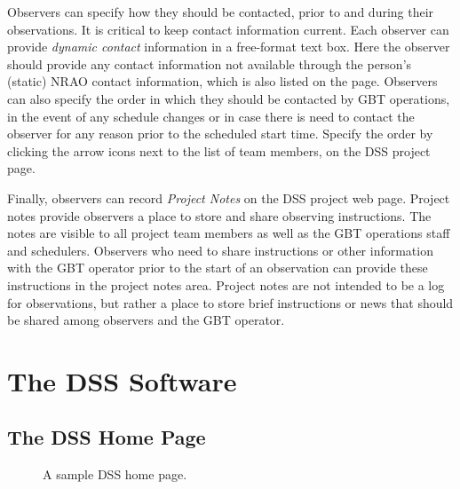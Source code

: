 Observers can specify how they should be contacted, prior to and during their
observations. It is critical to keep contact information current.
Each observer can provide {\it dynamic contact} information in a free-format
text box. Here the observer should provide 
any contact information not available through the person's (static) \gls{NRAO}
contact information, which is also listed on the page. Observers can also specify
the order in which they should be contacted by \gls{GBT} operations, in the event
of any schedule changes or in case there is need to contact the observer for any
reason prior to the scheduled start time. Specify the order by clicking the arrow
icons next to the list of team members, on the \gls{DSS} project page.

Finally, observers can record {\it Project Notes} on the \gls{DSS} project web page.
Project notes provide observers a place to store and share observing instructions.
The notes are visible to all project team members as well as the \gls{GBT} operations
staff and schedulers. Observers who need to share instructions or other information
with the \gls{GBT} operator prior to the start of an observation can provide these
instructions in the project notes area. Project notes are not intended to be a log
for observations, but rather a place to store brief instructions or news that should
be shared among observers and the \gls{GBT} operator.

\newpage

\section{The DSS Software}

\subsection{The DSS Home Page}
\begin{figure}[!h]
\begin{center}
\caption[A sample DSS home page]
{A sample \gls{DSS} home page.
\label{fig:dsshome}}
\end{center}
\end{figure}

